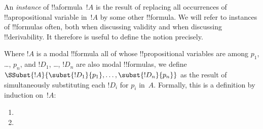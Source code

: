 \documentclass[../../../include/open-logic-section]{subfiles}
\begin{document}


An \emph{instance} of !!a{formula}~$!A$ is the result of replacing all
occurrences of !!a{propositional variable} in~$!A$ by some other
!!{formula}. We will refer to instances of !!{formula}s often, both
when discussing validity and when discussing !!{derivability}. It
therefore is useful to define the notion precisely.

\begin{defn}\label{def:subst-inst}
  Where $!A$ is a modal !!{formula} all of whose !!{propositional
    variable}s are among $p_1$, \dots, $p_n$, and $!D_1$, \dots,
  $!D_n$ are also modal !!{formula}s, we define
  $\SSubst{!A}{\subst{!D_1}{p_1}, \dots, \subst{!D_n}{p_n}}$ as the
  result of simultaneously substituting each $!D_i$ for $p_i$
  in~$\!A$. Formally, this is a definition by induction on~$!A$:
  \begin{enumerate}
    \item {}
    \item {}
\end{enumerate}
\end{defn}
\end{document}
